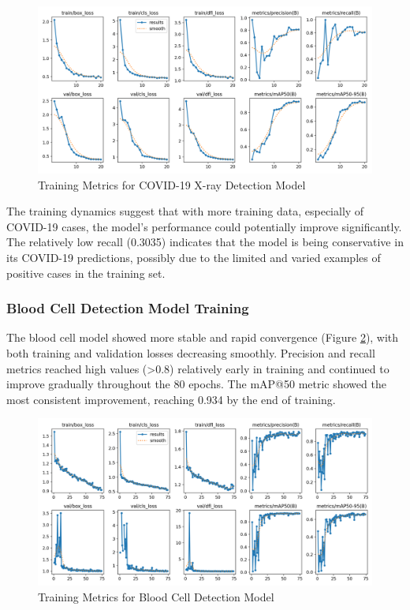 \begin{multicols}{2}
\begin{figure}[h]
\centering
\includegraphics[width=0.9\columnwidth]{../datas/x_ray_summary_datas/x_ray_results.png}
\caption{Training Metrics for COVID-19 X-ray Detection Model}
\label{fig:covid_training}
\end{figure}

The training dynamics suggest that with more training data, especially of COVID-19 cases, the model's performance could potentially improve significantly. The relatively low recall (0.3035) indicates that the model is being conservative in its COVID-19 predictions, possibly due to the limited and varied examples of positive cases in the training set.

\subsubsection{Blood Cell Detection Model Training}

The blood cell model showed more stable and rapid convergence (Figure \ref{fig:blood_cell_training}), with both training and validation losses decreasing smoothly. Precision and recall metrics reached high values (>0.8) relatively early in training and continued to improve gradually throughout the 80 epochs. The mAP@50 metric showed the most consistent improvement, reaching 0.934 by the end of training.

\begin{figure}[h]
\centering
\includegraphics[width=0.9\columnwidth]{../datas/blood_cell_summary_datas/blood_cells_results.png}
\caption{Training Metrics for Blood Cell Detection Model}
\label{fig:blood_cell_training}
\end{figure}


\end{multicols}
